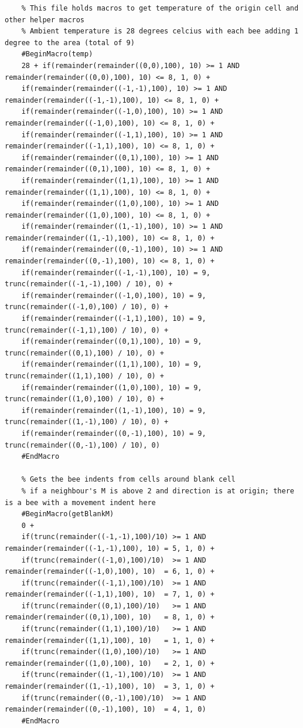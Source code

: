 \documentclass[conference,compsoc,onecolumn]{IEEEtran}
\begin{document}
\begin{lstlisting}
	% This file holds macros to get temperature of the origin cell and other helper macros
	% Ambient temperature is 28 degrees celcius with each bee adding 1 degree to the area (total of 9)
	#BeginMacro(temp)
	28 + if(remainder(remainder((0,0),100), 10) >= 1 AND remainder(remainder((0,0),100), 10) <= 8, 1, 0) + 
	if(remainder(remainder((-1,-1),100), 10) >= 1 AND remainder(remainder((-1,-1),100), 10) <= 8, 1, 0) + 
	if(remainder(remainder((-1,0),100), 10) >= 1 AND remainder(remainder((-1,0),100), 10) <= 8, 1, 0) + 
	if(remainder(remainder((-1,1),100), 10) >= 1 AND remainder(remainder((-1,1),100), 10) <= 8, 1, 0) + 
	if(remainder(remainder((0,1),100), 10) >= 1 AND remainder(remainder((0,1),100), 10) <= 8, 1, 0) + 
	if(remainder(remainder((1,1),100), 10) >= 1 AND remainder(remainder((1,1),100), 10) <= 8, 1, 0) + 
	if(remainder(remainder((1,0),100), 10) >= 1 AND remainder(remainder((1,0),100), 10) <= 8, 1, 0) + 
	if(remainder(remainder((1,-1),100), 10) >= 1 AND remainder(remainder((1,-1),100), 10) <= 8, 1, 0) + 
	if(remainder(remainder((0,-1),100), 10) >= 1 AND remainder(remainder((0,-1),100), 10) <= 8, 1, 0) +
	if(remainder(remainder((-1,-1),100), 10) = 9, trunc(remainder((-1,-1),100) / 10), 0) +
	if(remainder(remainder((-1,0),100), 10) = 9, trunc(remainder((-1,0),100) / 10), 0) +
	if(remainder(remainder((-1,1),100), 10) = 9, trunc(remainder((-1,1),100) / 10), 0) +
	if(remainder(remainder((0,1),100), 10) = 9, trunc(remainder((0,1),100) / 10), 0) +
	if(remainder(remainder((1,1),100), 10) = 9, trunc(remainder((1,1),100) / 10), 0) +
	if(remainder(remainder((1,0),100), 10) = 9, trunc(remainder((1,0),100) / 10), 0) +
	if(remainder(remainder((1,-1),100), 10) = 9, trunc(remainder((1,-1),100) / 10), 0) +
	if(remainder(remainder((0,-1),100), 10) = 9, trunc(remainder((0,-1),100) / 10), 0)
	#EndMacro
	
	% Gets the bee indents from cells around blank cell
	% if a neighbour's M is above 2 and direction is at origin; there is a bee with a movement indent here
	#BeginMacro(getBlankM)
	0 + 
	if(trunc(remainder((-1,-1),100)/10) >= 1 AND remainder(remainder((-1,-1),100), 10) = 5, 1, 0) + 
	if(trunc(remainder((-1,0),100)/10)  >= 1 AND remainder(remainder((-1,0),100), 10)  = 6, 1, 0) + 
	if(trunc(remainder((-1,1),100)/10)  >= 1 AND remainder(remainder((-1,1),100), 10)  = 7, 1, 0) + 
	if(trunc(remainder((0,1),100)/10)   >= 1 AND remainder(remainder((0,1),100), 10)   = 8, 1, 0) + 
	if(trunc(remainder((1,1),100)/10)   >= 1 AND remainder(remainder((1,1),100), 10)   = 1, 1, 0) + 
	if(trunc(remainder((1,0),100)/10)   >= 1 AND remainder(remainder((1,0),100), 10)   = 2, 1, 0) + 
	if(trunc(remainder((1,-1),100)/10)  >= 1 AND remainder(remainder((1,-1),100), 10)  = 3, 1, 0) + 
	if(trunc(remainder((0,-1),100)/10)  >= 1 AND remainder(remainder((0,-1),100), 10)  = 4, 1, 0)
	#EndMacro
	

\end{lstlisting}
\end{document}
